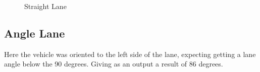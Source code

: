     \begin{figure}[h]
    \centering
    \caption{Straight Lane} \label{fig:StraightLane}
    \end{figure}
    
    
    \subsection{Angle Lane}
    Here the vehicle was oriented to the left side of the lane, expecting getting a lane angle below the 90 degrees. Giving as an output a result of 86 degrees.
    
